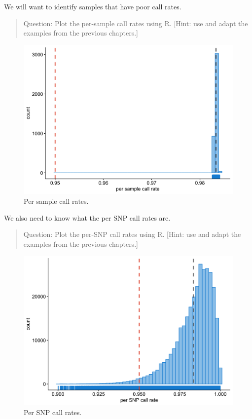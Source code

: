 \documentclass[
]{book}
\begin{document}
We will want to identify samples that have poor call rates.

\begin{quote}
Question: Plot the per-sample call rates using R. {[}Hint: use and adapt the examples from the previous chapters.{]}
\end{quote}

\begin{figure}[H]

{\centering \includegraphics[width=0.85\linewidth]{img/_gwas_dummy/show-sample-callrate-gwas} 

}

\caption{Per sample call rates.}\label{fig:unnamed-chunk-4}
\end{figure}

We also need to know what the per SNP call rates are.

\begin{quote}
Question: Plot the per-SNP call rates using R. {[}Hint: use and adapt the examples from the previous chapters.{]}
\end{quote}

\begin{figure}[H]

{\centering \includegraphics[width=0.85\linewidth]{img/_gwas_dummy/show-snp-callrate-gwas} 

}

\caption{Per SNP call rates.}\label{fig:unnamed-chunk-5}
\end{figure}
\end{document}
